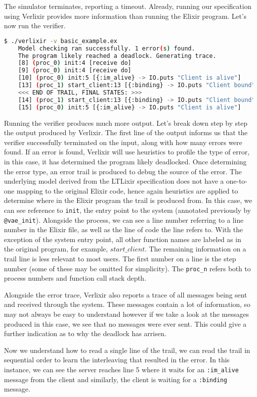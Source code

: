 The simulator terminates, reporting a timeout. Already, running our specification using Verlixir provides more information than running the Elixir program. Let's now run the verifier.
\begin{lstlisting}[language=bash, xleftmargin=.2\linewidth]
    $ ./verlixir -v basic_example.ex
    Model checking ran successfully. 1 error(s) found.
    The program likely reached a deadlock. Generating trace.
    [8] (proc_0) init:4 [receive do]
    [9] (proc_0) init:4 [receive do]
    [10] (proc_0) init:5 [{:im_alive} -> IO.puts "Client is alive"]
    [13] (proc_1) start_client:13 [{:binding} -> IO.puts "Client bound"]
    <<< END OF TRAIL, FINAL STATES: >>>
    [14] (proc_1) start_client:13 [{:binding} -> IO.puts "Client bound"]
    [15] (proc_0) init:5 [{:im_alive} -> IO.puts "Client is alive"]
\end{lstlisting}
Running the verifier produces much more output. Let's break down step by step the output produced by Verlixir. The first line of the output informs us that the verifier successfully terminated on the input, along with how many errors were found. If an error is found, Verlixir will use heuristics to profile the type of error, in this case, it has determined the program likely deadlocked. Once determining the error type, an error trail is produced to debug the source of the error. The underlying model derived from the LTLixir specification does not have a one-to-one mapping to the original Elixir code, hence again heuristics are applied to determine where in the Elixir program the trail is produced from. In this case, we can see reference to \texttt{init}, the entry point to the system (annotated previously by \texttt{@vae\_init}). Alongside the process, we can see a line number referring to a line number in the Elixir file, as well as the line of code the line refers to. With the exception of the system entry point, all other function names are labeled as in the original program, for example, $start\_client$. The remaining information on a trail line is less relevant to most users. The first number on a line is the step number (some of these may be omitted for simplicity). The \texttt{proc\_n} refers both to process numbers and function call stack depth.
\par
Alongside the error trace, Verlixir also reports a trace of all messages being sent and received through the system. These messages contain a lot of information, so may not always be easy to understand however if we take a look at the messages produced in this case, we see that no messages were ever sent. This could give a further indication as to why the deadlock has arrisen.
\par
Now we understand how to read a single line of the trail, we can read the trail in sequential order to learn the interleaving that resulted in the error. In this instance, we can see the server reaches line 5 where it waits for an \texttt{:im\_alive} message from the client and similarly, the client is waiting for a \texttt{:binding} message.
